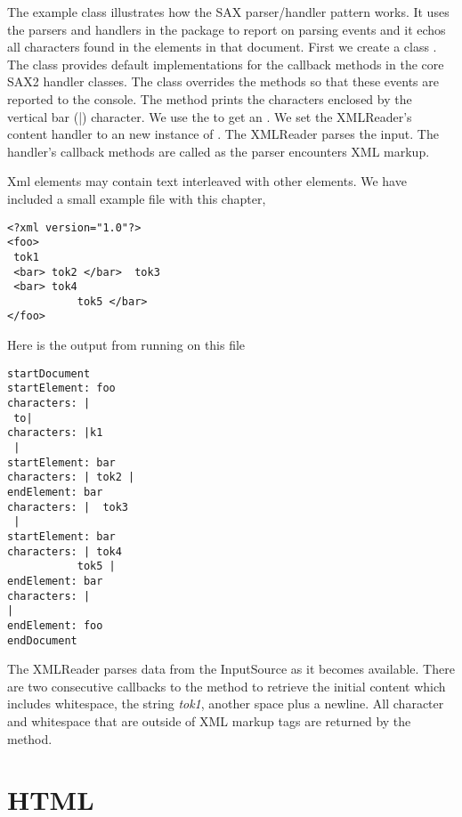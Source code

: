 The example class  illustrates 
how the SAX parser/handler pattern works.
It uses the parsers and handlers in the
 package to report on parsing events and it
echos all characters found in the elements in that document.
%
% 
First we create a class .
%
%
The class  provides default implementations
for the callback methods in the core SAX2 handler classes.
The  class overrides the methods 
so that these events are reported to the console.
The  method prints the characters enclosed by
the vertical bar (|) character.
%
%
We use the  to get an .
We set the XMLReader's content handler to an new instance
of .
The XMLReader parses the input.
The handler's callback methods are called as the parser encounters
XML markup.

Xml elements may contain text interleaved with other elements.
We have included a small example file with this chapter,
%
\begin{verbatim}
<?xml version="1.0"?>
<foo> 
 tok1 
 <bar> tok2 </bar>  tok3 
 <bar> tok4 
           tok5 </bar>
</foo>
\end{verbatim} 
Here is the output from running  on this file
\begin{verbatim} 
startDocument
startElement: foo
characters: | 
 to|
characters: |k1 
 |
startElement: bar
characters: | tok2 |
endElement: bar
characters: |  tok3 
 |
startElement: bar
characters: | tok4 
           tok5 |
endElement: bar
characters: |
|
endElement: foo
endDocument
\end{verbatim}
The XMLReader parses data from the InputSource as it becomes available.
There are two consecutive callbacks to the  method to
retrieve the initial content which includes whitespace, the string \emph{tok1},
another space plus a newline.
All character and whitespace that are outside of XML markup tags are returned
by the  method.







\section{HTML}

